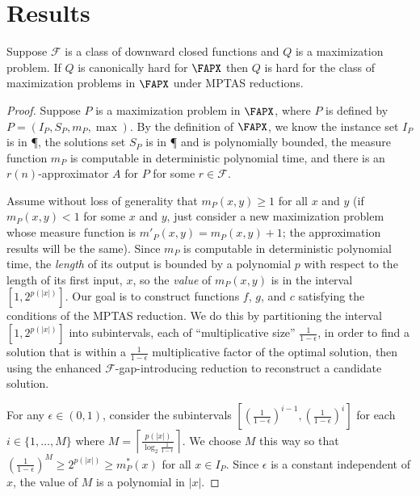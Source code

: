 \documentclass{article}
\newcommand{\ceil}[1]{\left\lceil#1\right\rceil}
\begin{document}
\section{Results}

\begin{theorem}[{\cite[Theorem~2]{ep06}}]\label{thm:hardness}
  Suppose $\mathcal{F}$ is a class of downward closed functions and $Q$ is a maximization problem.
  If $Q$ is canonically hard for $\FAPX$ then $Q$ is hard for the class of maximization problems in $\FAPX$ under MPTAS reductions.
\end{theorem}
\begin{proof}
  Suppose $P$ is a maximization problem in $\FAPX$, where $P$ is defined by $P = (I_P, S_P, m_P, \max)$.
  By the definition of $\FAPX$, we know the instance set $I_P$ is in \P, the solutions set $S_P$ is in \P{} and is polynomially bounded, the measure function $m_P$ is computable in deterministic polynomial time, and there is an $r(n)$-approximator $A$ for $P$ for some $r \in \mathcal{F}$.

  Assume without loss of generality that $m_P(x, y) \geq 1$ for all $x$ and $y$ (if $m_P(x, y) < 1$ for some $x$ and $y$, just consider a new maximization problem whose measure function is $m'_P(x, y) = m_P(x, y) + 1$; the approximation results will be the same).
  Since $m_P$ is computable in deterministic polynomial time, the \emph{length} of its output is bounded by a polynomial $p$ with respect to the length of its first input, $x$, so the \emph{value} of $m_P(x, y)$ is in the interval $[1, 2^{p(|x|)}]$.
  Our goal is to construct functions $f$, $g$, and $c$ satisfying the conditions of the MPTAS reduction.
  We do this by partitioning the interval $[1, 2^{p(|x|)}]$ into subintervals, each of ``multiplicative size'' $\frac{1}{1 - \epsilon}$, in order to find a solution that is within a $\frac{1}{1 - \epsilon}$ multiplicative factor of the optimal solution, then using the enhanced $\mathcal{F}$-gap-introducing reduction to reconstruct a candidate solution.

  For any $\epsilon \in (0, 1)$, consider the subintervals $\left[\left(\frac{1}{1 - \epsilon}\right)^{i - 1}, \left(\frac{1}{1 - \epsilon}\right)^i\right]$ for each $i \in \{1, \dotsc, M\}$ where $M = \ceil{\frac{p(|x|)}{\log_2{\frac{1}{1 - \epsilon}}}}$.
  We choose $M$ this way so that $\left(\frac{1}{1 - \epsilon}\right)^M \geq 2^{p(|x|)} \geq m_P^*(x)$ for all $x \in I_P$.
  Since $\epsilon$ is a constant independent of $x$, the value of $M$ is a polynomial in $|x|$.


\end{proof}
\end{document}
